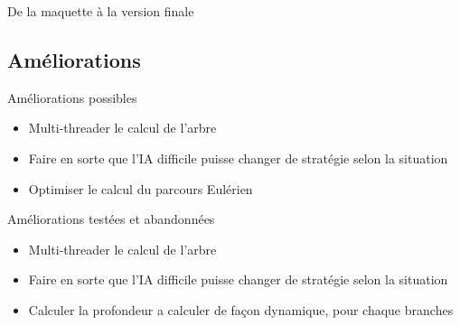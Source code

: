 \documentclass{beamer}
\begin{document}
\begin{frame}{De la maquette à la version finale}
\subsection{Améliorations}
\begin{frame}{}
\begin{block}{Améliorations possibles}
\begin{itemize}
 \item<1-> Multi-threader le calcul de l’arbre
 \item<2-> Faire en sorte que l’IA difficile puisse changer de stratégie selon la situation
 \item<3-> Optimiser le calcul du parcours Eulérien
\end{itemize}
\end{block}
\begin{block}{Améliorations testées et abandonnées}
\begin{itemize}
 \item<1-> Multi-threader le calcul de l’arbre
 \item<2-> Faire en sorte que l’IA difficile puisse changer de stratégie selon la situation
 \item<3-> Calculer la profondeur a calculer de façon dynamique, pour chaque branches
\end{itemize}
\end{block}
\end{frame}


\end{frame}
\end{document}
